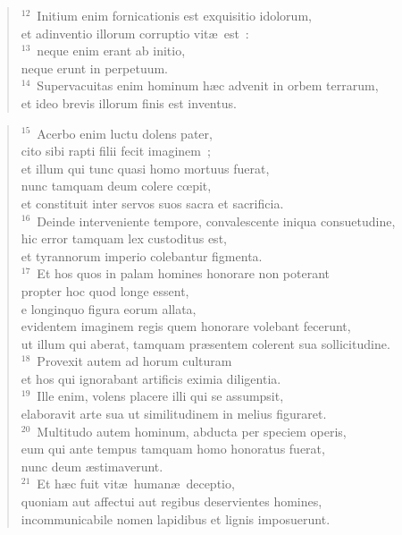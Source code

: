 \begin{flushleft}
\begin{verse}
${}^{12}$~Initium enim fornicationis est exquisitio idolorum,\\ et adinventio illorum corruptio vit\ae\ est~:\\
${}^{13}$~neque enim erant ab initio,\\ neque erunt in perpetuum.\\
${}^{14}$~Supervacuitas enim hominum h\ae c advenit in orbem terrarum,\\ et ideo brevis illorum finis est inventus.\end{verse}\end{flushleft}


\begin{flushleft}\begin{verse}${}^{15}$~Acerbo enim luctu dolens pater,\\ cito sibi rapti filii fecit imaginem~;\\ et illum qui tunc quasi homo mortuus fuerat,\\ nunc tamquam deum colere cœpit,\\ et constituit inter servos suos sacra et sacrificia.\\
${}^{16}$~Deinde interveniente tempore, convalescente iniqua consuetudine,\\ hic error tamquam lex custoditus est,\\ et tyrannorum imperio colebantur figmenta.\\
${}^{17}$~Et hos quos in palam homines honorare non poterant\\ propter hoc quod longe essent,\\ e longinquo figura eorum allata,\\ evidentem imaginem regis quem honorare volebant fecerunt,\\ ut illum qui aberat, tamquam pr\ae sentem colerent sua sollicitudine.\\
${}^{18}$~Provexit autem ad horum culturam\\ et hos qui ignorabant artificis eximia diligentia.\\
${}^{19}$~Ille enim, volens placere illi qui se assumpsit,\\ elaboravit arte sua ut similitudinem in melius figuraret.\\
${}^{20}$~Multitudo autem hominum, abducta per speciem operis,\\ eum qui ante tempus tamquam homo honoratus fuerat,\\ nunc deum \ae stimaverunt.\\
${}^{21}$~Et h\ae c fuit vit\ae\ human\ae\ deceptio,\\ quoniam aut affectui aut regibus deservientes homines,\\ incommunicabile nomen lapidibus et lignis imposuerunt.\end{verse}\end{flushleft}



